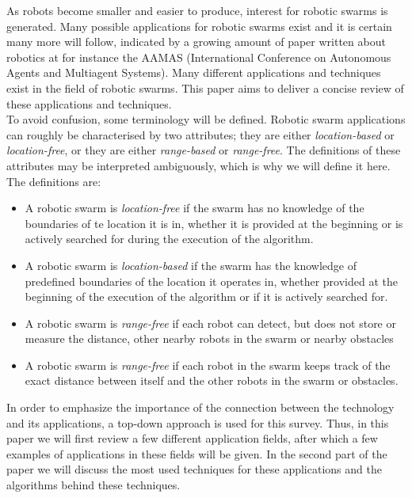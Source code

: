 As robots become smaller and easier to produce, interest for robotic swarms is generated. Many possible applications for robotic swarms exist and it is certain many more will follow, indicated by a growing amount of paper written about robotics at for instance the AAMAS (International Conference on Autonomous Agents and Multiagent Systems). \cite{Amigoni2014} Many different applications and techniques exist in the field of robotic swarms. This paper aims to deliver a concise review of these applications and techniques. \\

To avoid confusion, some terminology will be defined. Robotic swarm applications can roughly be characterised by two attributes; they are either \emph{location-based} or \emph{location-free}, or they are either \emph{range-based} or \emph{range-free}. The definitions of these attributes may be interpreted ambiguously, which is why we will define it here. The definitions are:

  \begin{itemize}
    \item A robotic swarm is \emph{location-free} if the swarm has no knowledge of the boundaries of te location it is in, whether it is provided at the beginning or is actively searched for during the execution of the algorithm. 
    \item A robotic swarm is \emph{location-based} if the swarm has the knowledge of predefined boundaries of the location it operates in, whether provided at the beginning of the execution of the algorithm or if it is actively searched for. 
    \item A robotic swarm is \emph{range-free} if each robot can detect, but does not store or measure the distance, other nearby robots in the swarm or nearby obstacles
    \item  A robotic swarm is \emph{range-free} if each robot in the swarm keeps track of the exact distance between itself and the other robots in the swarm or obstacles. 
  \end{itemize}


In order to emphasize the importance of the connection between the technology and its applications, a top-down approach is used for this survey. Thus,  in this paper we will first review a few different application fields, after which a few examples of applications in these fields will be given. In the second part of the paper we will discuss the most used techniques for these applications and the algorithms behind these techniques. \\
